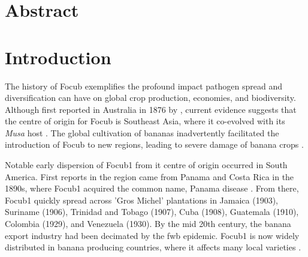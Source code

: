 
\section{Abstract}

\newpage

\section{Introduction}

The history of \acf{Focub} exemplifies the profound impact  pathogen spread and diversification can have on global crop production, economies, and biodiversity. Although first reported in Australia in 1876 by \textcite{Bancroft1876}, current evidence suggests that the centre of origin for \ac{Focub} is Southeast Asia, where it co-evolved with its \textit{Musa} host \parencite{Maryani2019}. The global cultivation of bananas inadvertently facilitated the introduction of \ac{Focub} to new regions, leading to severe damage of banana crops \parencite{Kema2021}.

Notable early dispersion of \ac{Focub1} from it centre of origin occurred in South America. First reports in the region came from Panama and Costa Rica in the 1890s, where \ac{Focub1} acquired the common name, Panama disease \parencite{Ashby1913}. From there, \ac{Focub1} quickly spread across 'Gros Michel' plantations in Jamaica (1903), Suriname (1906), Trinidad and Tobago (1907), Cuba (1908), Guatemala (1910), Colombia (1929), and Venezuela (1930). By the mid 20th century, the banana export industry had been decimated by the \ac{fwb} epidemic. \Ac{Focub1} is now widely distributed in banana producing countries, where it affects many local varieties \parencite{Dita2018}.

